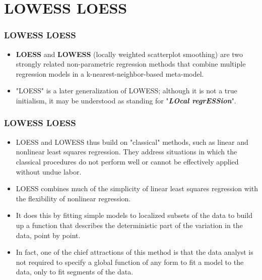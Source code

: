 \documentclass{beamer}
\begin{document}
\section{LOWESS LOESS}
\begin{frame}
	\frametitle{LOWESS LOESS}
	\large
	\begin{itemize}
		\item \textbf{LOESS} and \textbf{LOWESS} (locally weighted scatterplot smoothing) are two strongly related non-parametric regression methods that combine multiple regression models in a k-nearest-neighbor-based meta-model.
		\item  "LOESS" is a later generalization of LOWESS; although it is not a true initialism, it may be understood as standing for "\textit{\textbf{LOcal regrESSion}}".
		
	\end{itemize}
\end{frame}
\begin{frame}\frametitle{LOWESS LOESS}\large	
	\begin{itemize}
		\item LOESS and LOWESS thus build on "classical" methods, such as linear and nonlinear least squares regression. They address situations in which the classical procedures do not perform well or cannot be effectively applied without undue labor.
		\item LOESS combines much of the simplicity of linear least squares regression with the flexibility of nonlinear regression. 
		\item It does this by fitting simple models to localized subsets of the data to build up a function that describes the deterministic part of the variation in the data, point by point. 
		\item In fact, one of the chief attractions of this method is that the data analyst is not required to specify a global function of any form to fit a model to the data, only to fit segments of the data.
	\end{itemize}
\end{frame}
\end{document}
